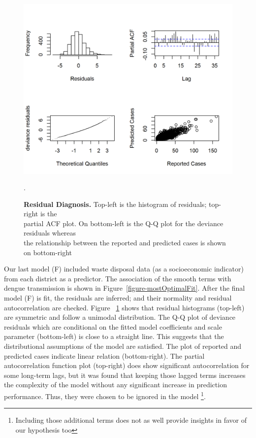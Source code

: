 \documentclass{bmcart}
\begin{document}
\begin{figure}[h!]
	\begin{center}
		\includegraphics[width= 1.0\textwidth]{19-resid-diagnosis}
		\caption{\textbf{Residual Diagnosis.} Top-left is the histogram of residuals; top-right is the \\ partial ACF plot. On bottom-left is the Q-Q plot for the deviance residuals whereas \\ the relationship between the reported and predicted cases is shown on bottom-right}.
		\label{figure:resid-diagnosis}
	\end{center}
\end{figure}



Our last model (F) included waste disposal data (as a socioeconomic indicator) from each district as a predictor. The association of the smooth terms with dengue transmission is shown in Figure~\ref{figure-mostOptimalFit}. After the final model (F) is fit, the residuals are inferred; and their normality and residual autocorrelation are checked. Figure ~\ref{figure:resid-diagnosis} shows that residual histograms (top-left) are symmetric and follow a unimodal distribution. The Q-Q plot of deviance residuals which are conditional on the fitted model coefficients and scale parameter (bottom-left) is close to a straight line. This suggests that the distributional assumptions of the model are satisfied. The plot of reported and predicted cases indicate linear relation (bottom-right). The partial autocorrelation function plot (top-right) does show significant autocorrelation for some long-term lags, but it was found that keeping those lagged terms increases the complexity of the model without any significant increase in prediction performance. Thus, they were chosen to be ignored in the model \footnote{Including those additional terms does not as well provide insights in favor of our hypothesis too}. 
\end{document}
